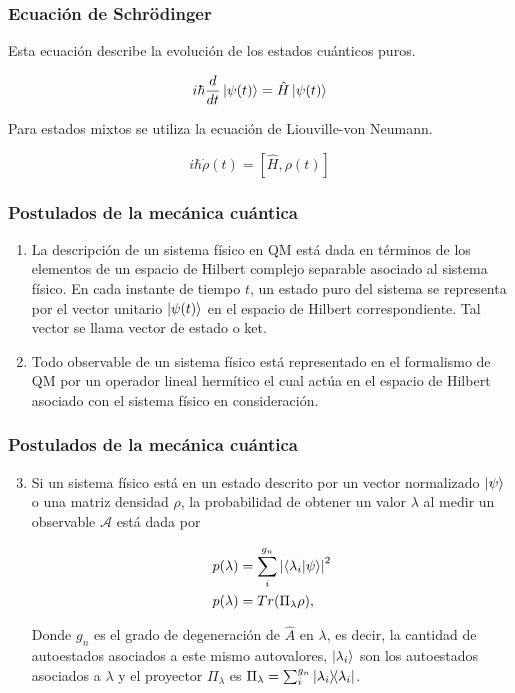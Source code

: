 \documentclass[xetex,mathserif,serif]{beamer}
\begin{document}
\begin{frame}
    \frametitle{Ecuación de Schrödinger}

    Esta ecuación describe la evolución de los estados cuánticos puros.

    \begin{equation}
        i \hbar \frac{d}{dt} \ket{\psi(t)} = \hat{H} \ket{\psi(t)}
    \end{equation}

    Para estados mixtos se utiliza la ecuación de Liouville-von Neumann.

    \begin{equation}
        i \hbar \dot{\rho}(t) = [\hat{H}, \rho(t)]
    \end{equation}

\end{frame}

\begin{frame}
    \frametitle{Postulados de la mecánica cuántica}

    \begin{enumerate}
        \item La descripción de un sistema físico en QM está dada en términos de los elementos de un espacio de Hilbert complejo separable asociado al sistema físico. En cada instante de tiempo $t$, un estado puro del sistema se representa por el vector unitario $\ket{\psi(t)}$ en el espacio de Hilbert correspondiente. Tal vector se llama vector de estado o ket.
        \item Todo observable de un sistema físico está representado en el formalismo de QM por un operador lineal hermítico el cual actúa en el espacio de Hilbert asociado con el sistema físico en consideración.
    \end{enumerate}
\end{frame}

\begin{frame}
    \frametitle{Postulados de la mecánica cuántica}

    \begin{enumerate}
        \setcounter{enumi}{2}
        \item Si un sistema físico está en un estado descrito por un vector normalizado $\ket{\psi}$ o una matriz densidad $\rho$, la probabilidad de obtener un valor $\lambda$ al medir un observable $\mathcal{A}$ está dada por 
            
            \begin{align}
                p(\lambda) &= \sum\limits_i^{g_n} \abs{\braket{\lambda_i}{\psi}}^2 \\
                p(\lambda) &= Tr(\Pi_\lambda \rho) ,
            \end{align}

            Donde $g_n$ es el grado de degeneración de $\hat{A}$ en $\lambda$, es decir, la cantidad de autoestados asociados a este mismo autovalores, $\ket{\lambda_i}$ son los autoestados asociados a $\lambda$ y el proyector $\Pi_\lambda$ es $\Pi_\lambda = \sum_i^{g_n} \ketbra{\lambda_i}$.
    \end{enumerate}
\end{frame}
\end{document}
